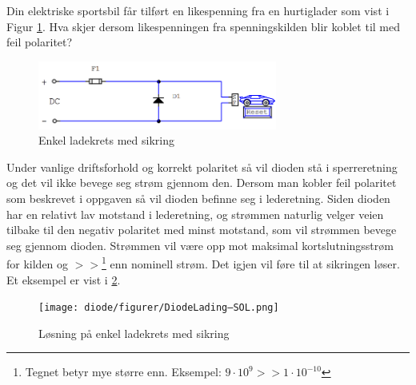 \begin{question}[name=Oppgave, topic=dioder]
Din elektriske sportsbil får tilført en likespenning fra en hurtiglader som vist i Figur \ref{fig:diodeLading}. Hva skjer dersom likespenningen fra spenningskilden blir koblet til med feil polaritet?
	
	\begin{figure}[H]
		\centering
		\includegraphics[width=0.7\textwidth]{diode/figurer/DiodeLading.png}
		\caption{Enkel ladekrets med sikring}
		\label{fig:diodeLading}
	\end{figure}
	
\end{question}

\vspace{0.5cm} %

\begin{solution}[name=Løsningsforslag oppgave]
	
Under vanlige driftsforhold og korrekt polaritet så vil dioden stå i sperreretning og det vil ikke bevege seg strøm gjennom den. Dersom man kobler feil polaritet som beskrevet i oppgaven så vil dioden befinne seg i lederetning. Siden dioden har en relativt lav motstand i lederetning, og strømmen naturlig velger veien tilbake til den negativ polaritet med minst motstand, som vil strømmen bevege seg gjennom dioden. Strømmen vil være opp mot maksimal kortslutningsstrøm for kilden og $>>$\footnote{Tegnet betyr mye større enn. Eksempel: $9\cdot10^{9}>>1\cdot10^{-10}$} enn nominell strøm. Det igjen vil føre til at sikringen løser. Et eksempel er vist i \ref{fig:diodeLadingSol}.
	\begin{figure}[H]
	\centering
	\texttt{[image: diode/figurer/DiodeLading–SOL.png]}
	\caption{Løsning på enkel ladekrets med sikring}
	\label{fig:diodeLadingSol}
\end{figure}

	
\end{solution}




